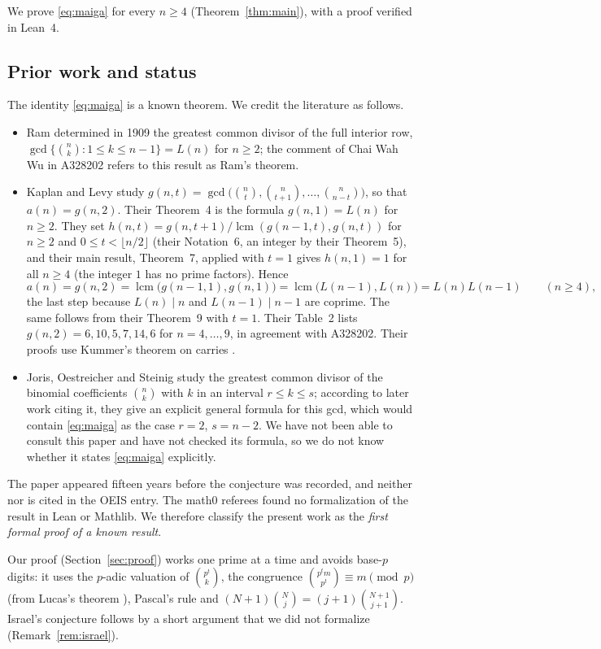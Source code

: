 \documentclass[11pt]{amsart}
\theoremstyle{plain}
\theoremstyle{definition}
\begin{document}
We prove \eqref{eq:maiga} for every $n\ge4$ (Theorem~\ref{thm:main}), with a proof verified in Lean~4.

\subsection*{Prior work and status}
The identity \eqref{eq:maiga} is a known theorem. We credit the literature as follows.
\begin{itemize}
\item Ram \cite{Ram} determined in 1909 the greatest common divisor of the full interior row, $\gcd\{\binom nk:1\le k\le n-1\}=L(n)$ for $n\ge2$; the comment of Chai Wah Wu in A328202 refers to this result as Ram's theorem.
\item Kaplan and Levy \cite{KL} study $g(n,t)=\gcd\bigl(\binom nt,\binom n{t+1},\dots,\binom n{n-t}\bigr)$, so that $a(n)=g(n,2)$. Their Theorem~4 is the formula $g(n,1)=L(n)$ for $n\ge2$. They set $h(n,t)=g(n,t+1)/\operatorname{lcm}(g(n-1,t),g(n,t))$ for $n\ge2$ and $0\le t<\lfloor n/2\rfloor$ (their Notation~6, an integer by their Theorem~5), and their main result, Theorem~7, applied with $t=1$ gives $h(n,1)=1$ for all $n\ge4$ (the integer $1$ has no prime factors). Hence
\[
  a(n)=g(n,2)=\operatorname{lcm}\bigl(g(n-1,1),g(n,1)\bigr)=\operatorname{lcm}\bigl(L(n-1),L(n)\bigr)=L(n)L(n-1)\qquad(n\ge4),
\]
the last step because $L(n)\mid n$ and $L(n-1)\mid n-1$ are coprime. The same follows from their Theorem~9 with $t=1$. Their Table~2 lists $g(n,2)=6,10,5,7,14,6$ for $n=4,\dots,9$, in agreement with A328202. Their proofs use Kummer's theorem on carries \cite{Kummer}.
\item Joris, Oestreicher and Steinig \cite{JOS} study the greatest common divisor of the binomial coefficients $\binom nk$ with $k$ in an interval $r\le k\le s$; according to later work citing it, they give an explicit general formula for this gcd, which would contain \eqref{eq:maiga} as the case $r=2$, $s=n-2$. We have not been able to consult this paper and have not checked its formula, so we do not know whether it states \eqref{eq:maiga} explicitly.
\end{itemize}
The paper \cite{KL} appeared fifteen years before the conjecture was recorded, and neither \cite{KL} nor \cite{JOS} is cited in the OEIS entry. The math0 referees found no formalization of the result in Lean or Mathlib. We therefore classify the present work as the \emph{first formal proof of a known result}.

Our proof (Section~\ref{sec:proof}) works one prime at a time and avoids base-$p$ digits: it uses the $p$-adic valuation of $\binom{p^t}{k}$, the congruence $\binom{p^tm}{p^t}\equiv m\pmod p$ (from Lucas's theorem \cite{Lucas}), Pascal's rule and $(N+1)\binom Nj=(j+1)\binom{N+1}{j+1}$. Israel's conjecture follows by a short argument that we did not formalize (Remark~\ref{rem:israel}).
\end{document}
